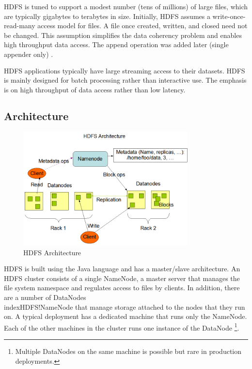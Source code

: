 \documentclass[11pt]{book}
\begin{document}
HDFS is tuned to support a modest number (tens of millions) of large files, which are typically gigabytes to terabytes in size. Initially, 
HDFS assumes a write-once-read-many access model for files. A file once created, written, and closed need not be changed. This assumption simplifies the data coherency problem and enables high throughput data access. The append operation was added later (single appender only) \cite{HDFS2010:265}.

HDFS applications typically have large streaming access to their datasets. HDFS is mainly designed for batch processing rather than interactive use. The emphasis is on high throughput of data access rather than low latency. 

\subsection{Architecture}
\begin{figure}[t]
\includegraphics[width=0.8\textwidth]{images/hdfs-architecture.png}
\centering
\caption{HDFS Architecture}
\end{figure}

HDFS is built using the Java language and has a master/slave architecture. An HDFS cluster consists of a single NameNode, a master server that manages the file system namespace and regulates access to files by clients. In addition, there are a number of DataNodes\\index{HDFS!NameNode} that manage storage attached to the nodes that they run on. A typical deployment has a dedicated machine that runs only the NameNode. Each of the other machines in the cluster runs one instance of the DataNode \footnote{Multiple DataNodes on the same machine is possible but rare in production deployments.}.
\end{document}
